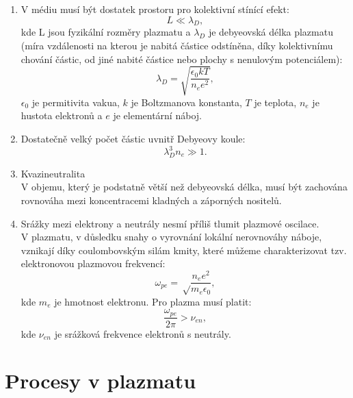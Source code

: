 \documentclass[12pt,oneside,final]{fithesis2}
\begin{document}
\begin{enumerate}

\item {V médiu musí být dostatek prostoru pro kolektivní stínící efekt:
	\begin{equation} L \ll \lambda_D \mathrm{,}\end{equation}
	kde L jsou fyzikální rozměry plazmatu a $\lambda_D$ je debyeovská délka plazmatu (míra vzdálenosti na kterou je nabitá částice odstíněna, díky 		kolektivnímu chování částic, od jiné nabité částice nebo plochy s nenulovým potenciálem):
	\begin{equation} \lambda_D = \sqrt{\frac{\epsilon_0 k T}{n_e e^2}} \mathrm{,}\end{equation}
	$\epsilon_0$ je permitivita vakua, $k$ je Boltzmanova konstanta, $T$ je teplota, $n_e$ je hustota elektronů a $e$ je elementární náboj.	
	}

\item{Dostatečně velký počet částic uvnitř Debyeovy koule:
	\begin{equation} \lambda_D^3 n_e \gg 1 \mathrm{.}\end{equation}
     }

\item{Kvazineutralita\\ 
	V objemu, který je podstatně větší než debyeovská délka, musí být zachována rovnováha mezi koncentracemi kladných a záporných nositelů.}

\item{
	Srážky mezi elektrony a neutrály nesmí příliš tlumit plazmové oscilace.\\
	V plazmatu, v důsledku snahy o vyrovnání lokální nerovnováhy náboje, vznikají díky coulombovským silám kmity, které můžeme charakterizovat tzv. elektronovou plazmovou frekvencí:
	\begin{equation}\omega_{pe} = \sqrt\frac{n_e e^2}{m_e \epsilon_0} \mathrm{,}\end{equation}
	kde $m_e$ je hmotnost elektronu. Pro plazma musí platit: 
	\begin{equation}\frac{\omega_{pe}}{2 \pi} > \nu_{en} \mathrm{,}\end{equation}
	kde $\nu_{en}$ je srážková frekvence elektronů s neutrály.
	}

\end{enumerate} 



\section{Procesy v plazmatu}
\end{document}
